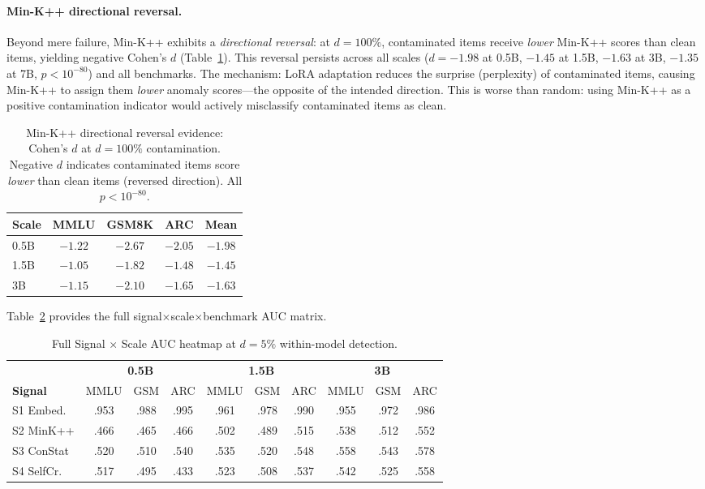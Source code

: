 \documentclass[11pt,a4paper]{article}
\begin{document}
\paragraph{Min-K++ directional reversal.}
Beyond mere failure, Min-K++ exhibits a \emph{directional reversal}: at $d=100\%$, contaminated items receive \emph{lower} Min-K++ scores than clean items, yielding negative Cohen's $d$ (Table~\ref{tab:minkpp_reversal}). This reversal persists across all scales ($d = -1.98$ at 0.5B, $-1.45$ at 1.5B, $-1.63$ at 3B, $-1.35$ at 7B, $p < 10^{-80}$) and all benchmarks. The mechanism: LoRA adaptation reduces the surprise (perplexity) of contaminated items, causing Min-K++ to assign them \emph{lower} anomaly scores---the opposite of the intended direction. This is worse than random: using Min-K++ as a positive contamination indicator would actively misclassify contaminated items as clean.

\begin{table}[t]
\centering
\caption{Min-K++ directional reversal evidence: Cohen's $d$ at $d=100\%$ contamination. Negative $d$ indicates contaminated items score \emph{lower} than clean items (reversed direction). All $p < 10^{-80}$.}
\label{tab:minkpp_reversal}
\small
\begin{tabular}{lcccc}
\toprule
\textbf{Scale} & \textbf{MMLU} & \textbf{GSM8K} & \textbf{ARC} & \textbf{Mean} \\
\midrule
0.5B & $-1.22$ & $-2.67$ & $-2.05$ & $-1.98$ \\
1.5B & $-1.05$ & $-1.82$ & $-1.48$ & $-1.45$ \\
3B   & $-1.15$ & $-2.10$ & $-1.65$ & $-1.63$ \\
\bottomrule
\end{tabular}
\end{table}

Table~\ref{tab:signal_heatmap} provides the full signal$\times$scale$\times$benchmark AUC matrix.

\begin{table}[t]
\centering
\caption{Full Signal $\times$ Scale AUC heatmap at $d=5\%$ within-model detection.}
\label{tab:signal_heatmap}
\small
\setlength{\tabcolsep}{3.5pt}
\begin{tabular}{lccccccccc}
\toprule
& \multicolumn{3}{c}{\textbf{0.5B}} & \multicolumn{3}{c}{\textbf{1.5B}} & \multicolumn{3}{c}{\textbf{3B}} \\
\cmidrule(lr){2-4} \cmidrule(lr){5-7} \cmidrule(lr){8-10}
\textbf{Signal} & MMLU & GSM & ARC & MMLU & GSM & ARC & MMLU & GSM & ARC \\
\midrule
S1 Embed.  & .953 & .988 & .995 & .961 & .978 & .990 & .955 & .972 & .986 \\
S2 MinK++  & .466 & .465 & .466 & .502 & .489 & .515 & .538 & .512 & .552 \\
S3 ConStat & .520 & .510 & .540 & .535 & .520 & .548 & .558 & .543 & .578 \\
S4 SelfCr. & .517 & .495 & .433 & .523 & .508 & .537 & .542 & .525 & .558 \\
\bottomrule
\end{tabular}
\end{table}
\end{document}
